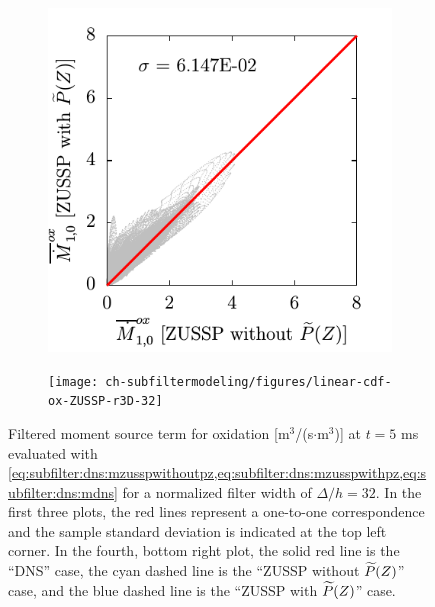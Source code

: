 \begin{figure}[ht]
\begin{subfigure}[b]{0.375\linewidth}
  \end{subfigure}
  \begin{subfigure}[b]{0.375\linewidth}
    \centering
    \includegraphics[width=\linewidth]{ch-subfiltermodeling/figures/lin-Mox4vsMox3-r3D-32}
  \end{subfigure}%
  \begin{subfigure}[b]{0.375\linewidth}
    \centering
    \texttt{[image: ch-subfiltermodeling/figures/linear-cdf-ox-ZUSSP-r3D-32]}
  \end{subfigure}
  \caption[Error Associated with $\pz = \beta(Z;\tf{Z},\tf{Z_V})$ for $\fst[M]{1,0}^{ox}$]{Filtered moment source term for oxidation [m$^3$/(s$\cdot$m$^3$)] at $t = 5$ ms evaluated with \cref{eq:subfilter:dns:mzusspwithoutpz,eq:subfilter:dns:mzusspwithpz,eq:subfilter:dns:mdns} for a normalized filter width of $\Delta/h = 32$. In the first three plots, the red lines represent a one-to-one correspondence and the sample standard deviation is indicated at the top left corner. In the fourth, bottom right plot, the solid red line is the ``DNS'' case, the cyan dashed line is the ``ZUSSP without $\widetilde{P}(Z)$'' case, and the blue dashed line is the ``ZUSSP with $\widetilde{P}(Z)$'' case.}
  \label{fig:subfilter:dns:erroronbetaox}
\end{figure}

